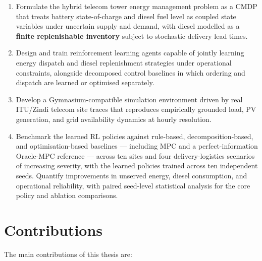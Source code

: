 \begin{enumerate}
  \item Formulate the hybrid telecom tower energy management problem as a CMDP
  that treats battery state-of-charge and diesel fuel level as coupled
  state variables under uncertain supply and demand, with diesel
  modelled as a \textbf{finite replenishable inventory} subject to stochastic
  delivery lead times.

  \item Design and train reinforcement learning agents capable of jointly
  learning energy dispatch and diesel replenishment strategies under
  operational constraints, alongside decomposed control baselines in
  which ordering and dispatch are learned or optimised separately.

  \item Develop a Gymnasium-compatible simulation environment driven by real
  ITU/Zindi telecom site traces that reproduces empirically grounded load,
  PV generation, and grid availability dynamics at hourly resolution.

  \item Benchmark the learned RL policies against rule-based,
  decomposition-based, and optimisation-based baselines --- including MPC and
  a perfect-information Oracle-MPC reference --- across ten sites and four
  delivery-logistics scenarios of increasing severity, with the learned
  policies trained across ten independent seeds. Quantify improvements in
  unserved energy, diesel
  consumption, and operational reliability, with paired seed-level
  statistical analysis for the core policy and ablation comparisons.
\end{enumerate}


\section{Contributions}

The main contributions of this thesis are:

